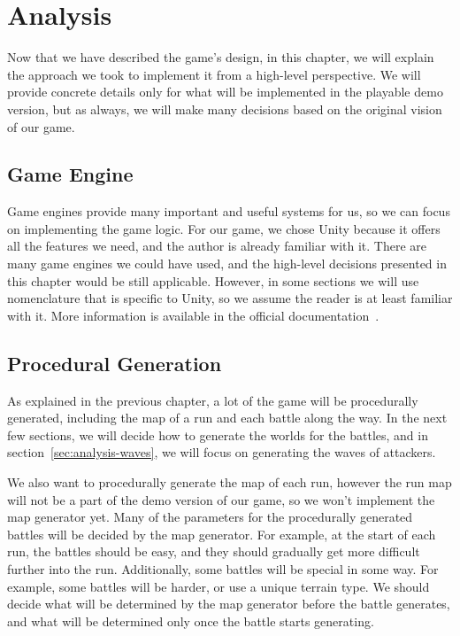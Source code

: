 \chapter{Analysis}

Now that we have described the game's design, in this chapter, we will explain the approach we took to implement it from a high-level perspective.
We will provide concrete details only for what will be implemented in the playable demo version, but as always, we will make many decisions based on the original vision of our game.

\section{Game Engine}

Game engines provide many important and useful systems for us, so we can focus on implementing the game logic.
For our game, we chose Unity because it offers all the features we need, and the author is already familiar with it.
There are many game engines we could have used, and the high-level decisions presented in this chapter would be still applicable.
However, in some sections we will use nomenclature that is specific to Unity, so we assume the reader is at least familiar with it.
More information is available in the official documentation~\cite{UnityDocs}.

\section{Procedural Generation}\label{sec:analysis-procedural-generation}

As explained in the previous chapter, a lot of the game will be procedurally generated, including the map of a run and each battle along the way.
In the next few sections, we will decide how to generate the worlds for the battles, and in section~\ref{sec:analysis-waves}, we will focus on generating the waves of attackers.

We also want to procedurally generate the map of each run, however the run map will not be a part of the demo version of our game, so we won't implement the map generator yet.
Many of the parameters for the procedurally generated battles will be decided by the map generator.
For example, at the start of each run, the battles should be easy, and they should gradually get more difficult further into the run.
Additionally, some battles will be special in some way.
For example, some battles will be harder, or use a unique terrain type.
We should decide what will be determined by the map generator before the battle generates, and what will be determined only once the battle starts generating.

